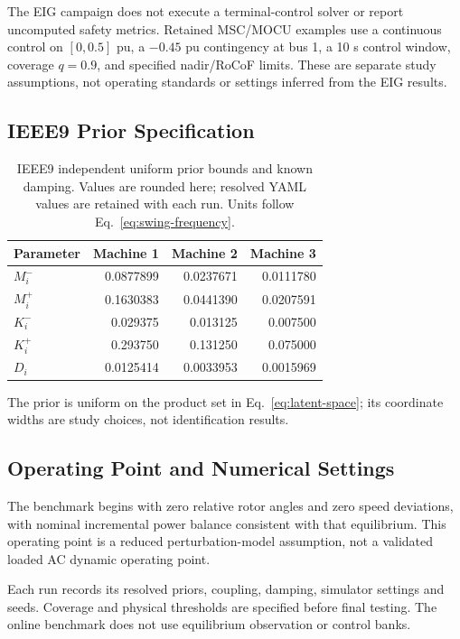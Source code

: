 \documentclass[journal]{IEEEtran}
\begin{document}
The EIG campaign does not execute a terminal-control solver or report
uncomputed safety metrics. Retained MSC/MOCU examples use a continuous
control on $[0,0.5]$ pu, a $-0.45$ pu contingency at bus 1, a 10 s control
window, coverage $q=0.9$, and specified nadir/RoCoF limits. These are
separate study assumptions, not operating standards or settings inferred
from the EIG results.

\subsection{IEEE9 Prior Specification}
\begin{table}[t]
\caption{IEEE9 independent uniform prior bounds and known damping. Values are rounded here; resolved YAML values are retained with each run. Units follow Eq.~\eqref{eq:swing-frequency}.}
\centering
\begin{tabular}{lrrr}
\toprule Parameter & Machine 1 & Machine 2 & Machine 3\\
\midrule
$M_i^-$ & 0.0877899 & 0.0237671 & 0.0111780\\
$M_i^+$ & 0.1630383 & 0.0441390 & 0.0207591\\
$K_i^-$ & 0.029375 & 0.013125 & 0.007500\\
$K_i^+$ & 0.293750 & 0.131250 & 0.075000\\
$D_i$ & 0.0125414 & 0.0033953 & 0.0015969\\
\bottomrule
\end{tabular}
\end{table}
The prior is uniform on the product set in Eq.~\eqref{eq:latent-space};
its coordinate widths are study choices, not identification results.

\subsection{Operating Point and Numerical Settings}
The benchmark begins with zero relative rotor angles and zero speed deviations,
with nominal incremental power balance consistent with that equilibrium.
This operating point is a reduced perturbation-model assumption, not a
validated loaded AC dynamic operating point.

Each run records its resolved priors, coupling, damping, simulator settings
and seeds. Coverage and physical thresholds are specified before final testing.
The online benchmark does not use equilibrium observation or control banks.
\end{document}
